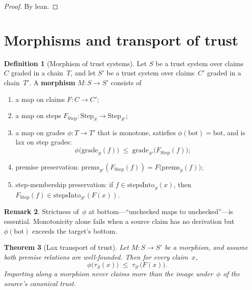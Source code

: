 \documentclass[11pt,a4paper]{article}
\theoremstyle{plain}
\newtheorem{theorem}{Theorem}[section]
\theoremstyle{definition}
\newtheorem{definition}[theorem]{Definition}
\newtheorem{remark}[theorem]{Remark}
\newcommand{\bott}{\mathrm{bot}}
\newcommand{\tauCan}{\tau}
\begin{document}
\begin{proof}
By lean.
\end{proof}

\section{Morphisms and transport of trust}

\begin{definition}[Morphism of trust systems]\label{def:mor}
Let $S$ be a trust system over claims~$C$ graded in a chain~$T$, and let
$S'$ be a trust system over claims~$C'$ graded in a chain~$T'$. A
\textbf{morphism} $M : S \to S'$ consists of
\begin{enumerate}
  \item a map on claims $F : C \to C'$;
  \item a map on steps $F_{\mathrm{Step}} : \mathrm{Step}_S \to
        \mathrm{Step}_{S'}$;
  \item a map on grades $\phi : T \to T'$ that is monotone,
        satisfies $\phi(\bott) = \bott$, and is lax on step grades:
        \[
          \phi\bigl(\mathrm{grade}_S(f)\bigr)
          \;\le\;
          \mathrm{grade}_{S'}\bigl(F_{\mathrm{Step}}(f)\bigr);
        \]
  \item premise preservation:
        $\mathrm{prems}_{S'}(F_{\mathrm{Step}}(f))
         = F\bigl(\mathrm{prems}_S(f)\bigr)$;
  \item step-membership preservation:
        if $f \in \mathrm{stepsInto}_S(x)$, then
        $F_{\mathrm{Step}}(f) \in \mathrm{stepsInto}_{S'}(F(x))$.
\end{enumerate}
\end{definition}

\begin{remark}
Strictness of~$\phi$ at bottom---``unchecked maps to unchecked''---is
essential. Monotonicity alone fails when a source claim has no derivation
but $\phi(\bott)$ exceeds the target's bottom.
\end{remark}

\begin{theorem}[Lax transport of trust]\label{thm:tau-transport}
Let $M : S \to S'$ be a morphism, and assume both premise relations are
well-founded. Then for every claim~$x$,
\begin{equation}
  \phi\bigl(\tauCan_S(x)\bigr)
  \;\le\;
  \tauCan_{S'}\bigl(F(x)\bigr).
\end{equation}
Importing along a morphism never claims more than the image under~$\phi$
of the source's canonical trust.
\end{theorem}
\end{document}
